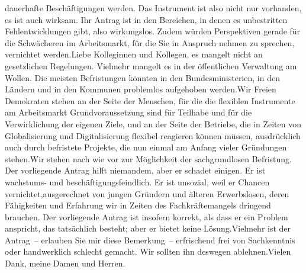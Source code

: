 \documentclass{article}
\begin{document}
dauerhafte Beschäftigungen werden. Das In­strument ist also nicht nur vorhanden, es ist auch wirksam. Ihr Antrag ist in den Bereichen, in denen es unbestritten Fehlentwicklungen gibt, also wirkungslos. Zudem würden Perspektiven gerade für die Schwächeren im Arbeitsmarkt, für die Sie in Anspruch nehmen zu sprechen, vernichtet werden.Liebe Kolleginnen und Kollegen, es mangelt nicht an gesetzlichen Regelungen. Vielmehr mangelt es in der öffentlichen Verwaltung am Wollen. Die meisten Befristungen könnten in den Bundesministerien, in den Ländern und in den Kommunen problemlos aufgehoben werden.Wir Freien Demokraten stehen an der Seite der Menschen, für die die flexiblen Instrumente am Arbeitsmarkt Grundvoraussetzung sind für Teilhabe und für die Verwirklichung der eigenen Ziele, und an der Seite der Betriebe, die in Zeiten von Globalisierung und Digitalisierung flexibel reagieren können müssen, ausdrücklich auch durch befristete Projekte, die nun einmal am Anfang vieler Gründungen stehen.Wir stehen nach wie vor zur Möglichkeit der sachgrundlosen Befristung. Der vorliegende Antrag hilft niemandem, aber er schadet einigen. Er ist wachstums- und beschäftigungsfeindlich. Er ist unsozial, weil er Chancen vernichtet,ausgerechnet von jungen Gründern und älteren Erwerbslosen, deren Fähigkeiten und Erfahrung wir in Zeiten des Fachkräftemangels dringend brauchen. Der vorliegende Antrag ist insofern korrekt, als dass er ein Problem anspricht, das tatsächlich besteht; aber er bietet keine Lösung.Vielmehr ist der Antrag – erlauben Sie mir diese Bemerkung – erfrischend frei von Sachkenntnis oder handwerklich schlecht gemacht. Wir sollten ihn deswegen ablehnen.Vielen Dank, meine Damen und Herren.
\end{document}
